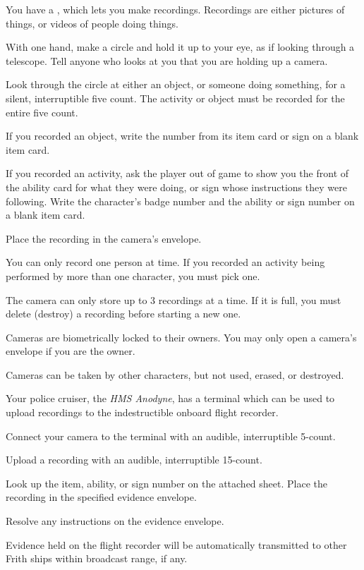 \documentclass[green]{guildcamp4}
\begin{document}
\name{\gEvidence{}}

You have a \iVideoCamera{\MYname}, which lets you make recordings. Recordings are either pictures of things, or videos of people doing things. 
	
\begin{enum}
    \item With one hand, make a circle and hold it up to your eye, as if looking through a telescope. Tell anyone who looks at you that you are holding up a camera.
    \item Look through the circle at either an object, or someone doing something, for a silent, interruptible five count. The activity or object must be recorded for the entire five count.
    \item If you recorded an object, write the number from its item card or sign on a blank item card.
    \item If you recorded an activity, ask the player out of game to show you the front of the ability card for what they were doing, or sign whose instructions they were following. Write the character's badge number and the ability or sign number on a blank item card.
    \item Place the recording in the camera's envelope.
\end{enum}

\begin{itemz}[Notes]
	\item You can only record one person at time. If you recorded an activity being performed by more than one character, you must pick one.
	\item The camera can only store up to 3 recordings at a time. If it is full, you must delete (destroy) a recording before starting a new one. 
	\item Cameras are biometrically locked to their owners. You may only open a camera's envelope if you are the owner.
	\item Cameras can be taken by other characters, but not used, erased, or destroyed. 
\end{itemz}
    
Your police cruiser, the \emph{HMS Anodyne}, has a terminal which can be used to upload recordings to the indestructible onboard flight recorder.

\begin{enum}
	\item Connect your camera to the terminal with an audible, interruptible 5-count.
    \item Upload a recording with an audible, interruptible 15-count.
    \item Look up the item, ability, or sign number on the attached sheet. Place the recording in the specified evidence envelope.    
    \item Resolve any instructions on the evidence envelope.
\end{enum}

\begin{itemz}[Notes]
	\item Evidence held on the flight recorder will be automatically transmitted to other Frith ships within broadcast range, if any.
\end{itemz}
\end{document}

